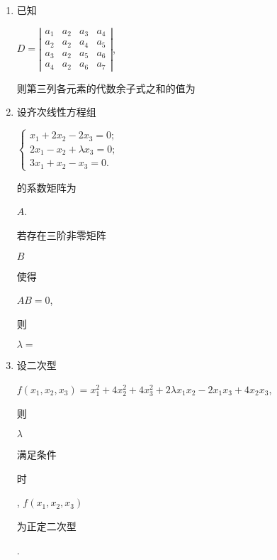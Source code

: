 \documentclass[10pt]{article}
\begin{document}
\begin{enumerate}
  \item \begin{CJK}{UTF8}{mj}已知\end{CJK} $D=\left|\begin{array}{llll}a_{1} & a_{2} & a_{3} & a_{4} \\ a_{2} & a_{2} & a_{4} & a_{5} \\ a_{3} & a_{2} & a_{5} & a_{6} \\ a_{4} & a_{2} & a_{6} & a_{7}\end{array}\right|$, \begin{CJK}{UTF8}{mj}则第三列各元素的代数余子式之和的值为\end{CJK}

  \item \begin{CJK}{UTF8}{mj}设齐次线性方程组\end{CJK} $\left\{\begin{array}{l}x_{1}+2 x_{2}-2 x_{3}=0 ; \\ 2 x_{1}-x_{2}+\lambda x_{3}=0 ; \\ 3 x_{1}+x_{2}-x_{3}=0 .\end{array}\right.$ \begin{CJK}{UTF8}{mj}的系数矩阵为\end{CJK} $A$. \begin{CJK}{UTF8}{mj}若存在三阶非零矩阵\end{CJK} $B$ \begin{CJK}{UTF8}{mj}使得\end{CJK} $A B=0$, \begin{CJK}{UTF8}{mj}则\end{CJK} $\lambda=$

  \item \begin{CJK}{UTF8}{mj}设二次型\end{CJK} $f\left(x_{1}, x_{2}, x_{3}\right)=x_{1}^{2}+4 x_{2}^{2}+4 x_{3}^{2}+2 \lambda x_{1} x_{2}-2 x_{1} x_{3}+4 x_{2} x_{3}$, \begin{CJK}{UTF8}{mj}则\end{CJK} $\lambda$ \begin{CJK}{UTF8}{mj}满足条件\end{CJK} \begin{CJK}{UTF8}{mj}时\end{CJK}, $f\left(x_{1}, x_{2}, x_{3}\right)$ \begin{CJK}{UTF8}{mj}为正定二次型\end{CJK}.


\end{enumerate}
\end{document}
